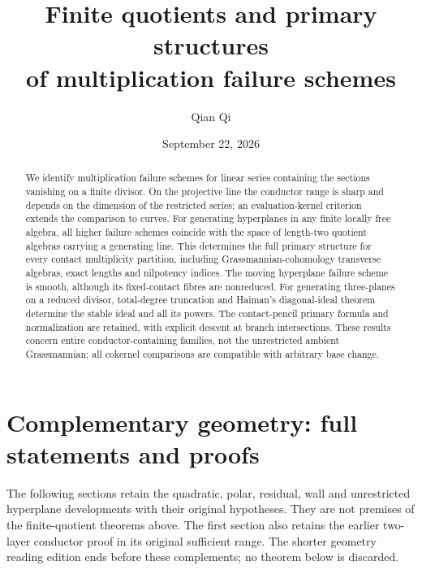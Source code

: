 \documentclass[11pt,reqno]{amsart}
\title[Finite quotients and multiplication failure]{Finite quotients and primary structures\\of multiplication failure schemes}
\author{Qian Qi}
\date{September 22, 2026}
\numberwithin{equation}{section}
\theoremstyle{definition}\newtheorem{definition}[theorem]{Definition}
\theoremstyle{remark}\newtheorem{remark}[theorem]{Remark}
\begin{document}
\begin{abstract}
We identify multiplication failure schemes for linear series containing the sections vanishing on a finite divisor. On the projective line the conductor range is sharp and depends on the dimension of the restricted series; an evaluation-kernel criterion extends the comparison to curves. For generating hyperplanes in any finite locally free algebra, all higher failure schemes coincide with the space of length-two quotient algebras carrying a generating line. This determines the full primary structure for every contact multiplicity partition, including Grassmannian-cohomology transverse algebras, exact lengths and nilpotency indices. The moving hyperplane failure scheme is smooth, although its fixed-contact fibres are nonreduced. For generating three-planes on a reduced divisor, total-degree truncation and Haiman's diagonal-ideal theorem determine the stable ideal and all its powers. The contact-pencil primary formula and normalization are retained, with explicit descent at branch intersections. These results concern entire conductor-containing families, not the unrestricted ambient Grassmannian; all cokernel comparisons are compatible with arbitrary base change.
\end{abstract}
\maketitle









\section*{Complementary geometry: full statements and proofs}
The following sections retain the quadratic, polar, residual, wall and
unrestricted hyperplane developments with their original hypotheses.
They are not premises of the finite-quotient theorems above. The first
section also retains the earlier two-layer conductor proof in its
original sufficient range. The shorter geometry reading edition ends
before these complements; no theorem below is discarded.












\appendix








\end{document}
